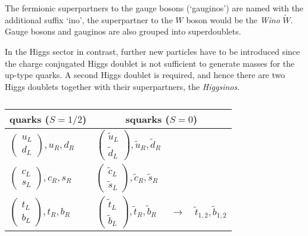 The fermionic superpartners to the \sm gauge bosons (`gauginos') are named with the additional suffix `ino', \eg the superpartner to the $W$ boson would be the \emph{Wino} $\tilde{W}$.
Gauge bosons and gauginos are also grouped into superdoublets.

In the \mssm Higgs sector in contrast, further new particles have to be introduced since the charge conjugated Higgs doublet is not sufficient to generate masses for the up-type quarks.
A second Higgs doublet is required, and hence there are two Higgs doublets together with their superpartners, the \emph{Higgsinos}.

\begin{table}[!htb]
\caption{}
\label{tab:Theory:MSSMParticles}
\begin{center}
        \begin{tabular}{lll}
        \toprule
        \multicolumn{1}{c}{quarks ($S=1/2$)} & \multicolumn{2}{c}{squarks ($S=0$)} \\
        \midrule
        $\begin{pmatrix} u_{L}\\d_{L} \end{pmatrix}, u_{R}, d_{R}$ &
        $\begin{pmatrix} \tilde{u}_{L}\\\tilde{d}_{L} \end{pmatrix}, \tilde{u}_{R}, \tilde{d}_{R}$ & \\
        $\begin{pmatrix} c_{L}\\s_{L} \end{pmatrix}, c_{R}, s_{R}$ &
        $\begin{pmatrix} \tilde{c}_{L}\\\tilde{s}_{L} \end{pmatrix}, \tilde{c}_{R}, \tilde{s}_{R}$ & \\
        $\begin{pmatrix} t_{L}\\b_{L} \end{pmatrix}, t_{R}, b_{R}$ &
        $\begin{pmatrix} \tilde{t}_{L}\\\tilde{b}_{L} \end{pmatrix}, \tilde{t}_{R}, \tilde{b}_{R}$ & 
        $\rightarrow\quad \tilde{t}_{1,2}, \tilde{b}_{1,2}$\\


\end{tabular}
\end{center}
\end{table}

